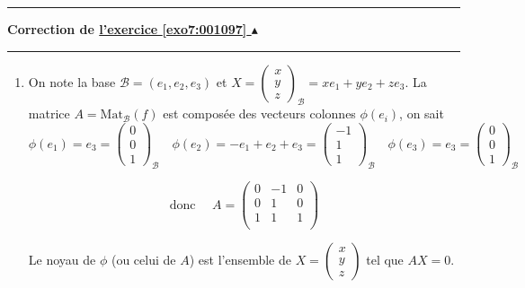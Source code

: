 \documentclass[11pt,a4paper]{article}
\newcounter{exo}
\newcommand{\correction}[1]{\hypertarget{cor7:#1}{}\label{cor7:#1}{\bf Correction de \hyperlink{exo7:#1}{l'exercice \ref{exo7:#1} $\blacktriangle$}}\vspace{1mm}\hrule\vspace{1mm}}
\newcommand{\fincorrection}{\vspace{1mm}\hrule\vspace*{7mm}}
\begin{document}
\fincorrection
\correction{001097}
\begin{enumerate}
  \item 
  On note la base $\mathcal{B}=(e_1,e_2,e_3)$
  et $X=\begin{pmatrix}x\\y\\z\end{pmatrix}_{\mathcal{B}}= x e_1+y e_2+z e_3$.
  La matrice $A=\textrm{Mat}_{\mathcal{B}}(f)$ est composée des vecteurs colonnes $\phi(e_i)$,
on sait 
$$\phi(e_1)=e_3 = \begin{pmatrix}0\\0\\1\end{pmatrix}_{\mathcal{B}} \quad
\phi(e_2)=-e_1+e_2+e_3 = \begin{pmatrix}-1\\1\\1\end{pmatrix}_{\mathcal{B}} \quad 
\phi(e_3)=e_3 = \begin{pmatrix}0\\0\\1\end{pmatrix}_{\mathcal{B}} \quad
$$

$$\text{donc } \quad A=\begin{pmatrix}
0 & -1 & 0 \\
0 & 1  & 0 \\
1 & 1  & 1 \\    
\end{pmatrix}$$

Le noyau de $\phi$ (ou celui de $A$) est l'ensemble de $X=\begin{pmatrix}x\\y\\z\end{pmatrix}$
tel que $AX=0$.


\end{enumerate}
\end{document}
